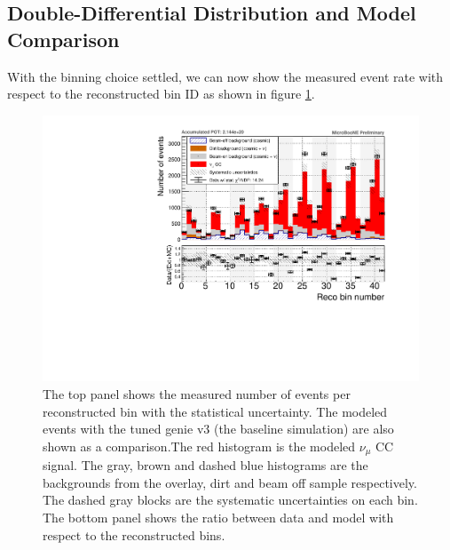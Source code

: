 \subsection{Double-Differential Distribution and Model Comparison} \label{sec:DoubleDifferentialResults}
With the binning choice settled, we can now show the measured event rate with respect to the reconstructed bin ID as shown in figure \ref{fig:EventRate_data}.
\begin{figure}[htbp]
  \centering
  \includegraphics[width=\textwidth]{images/NewCCInclusive/xsec/EventRate_GENIEv3_tune.pdf}
  \caption[Measured Double Differential Event Rate]{The top panel shows the measured number of events per reconstructed bin with the statistical uncertainty. The modeled events with the tuned \gls{genie} v3 (the baseline simulation) are also shown as a comparison.The red histogram is the modeled $\nu_\mu$ CC signal. The gray, brown and dashed blue histograms are the backgrounds from the overlay, dirt and beam off sample respectively. The dashed gray blocks are the systematic uncertainties on each bin. The bottom panel shows the ratio between data and model with respect to the reconstructed bins.}
  \label{fig:EventRate_data}
\end{figure}
